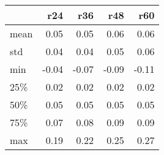 \begin{tabular}{lrrrr}
\toprule
{} &   r24 &   r36 &   r48 &   r60 \\
\midrule
mean &  0.05 &  0.05 &  0.06 &  0.06 \\
std  &  0.04 &  0.04 &  0.05 &  0.06 \\
min  & -0.04 & -0.07 & -0.09 & -0.11 \\
25\%  &  0.02 &  0.02 &  0.02 &  0.02 \\
50\%  &  0.05 &  0.05 &  0.05 &  0.05 \\
75\%  &  0.07 &  0.08 &  0.09 &  0.09 \\
max  &  0.19 &  0.22 &  0.25 &  0.27 \\
\bottomrule
\end{tabular}
